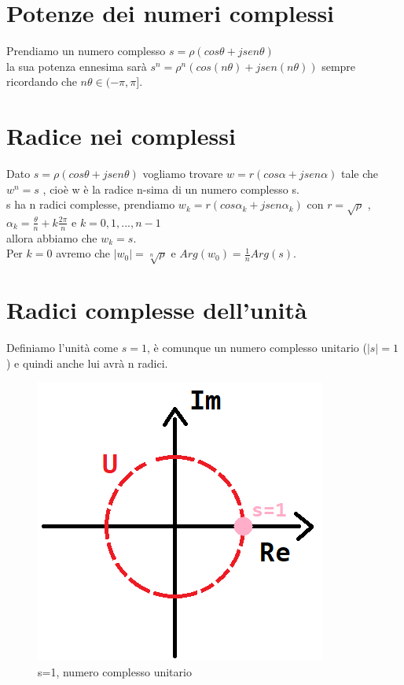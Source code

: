 \section{Potenze dei numeri complessi}
Prendiamo un numero complesso $ s = \rho (cos\theta + j sen\theta) $ \\
la sua potenza ennesima sarà $ s^{n} = \rho^{n} (cos(n\theta) + j sen(n\theta ) ) $ sempre ricordando che $n\theta \in (-\pi , \pi ]$.

\section{Radice nei complessi}

Dato $ s = \rho (cos\theta + j sen\theta) $ vogliamo trovare $ w = r (cos\alpha + j sen \alpha )$ tale che $ w^{n} = s$ , cioè w è la radice n-sima di un numero complesso s. \\
s ha n radici complesse, prendiamo $ w_{k} = r (cos\alpha_{k} + j sen \alpha_{k} ) $ con $r = \sqrt{\rho}$ , $ \alpha_{k} = \frac{\theta}{ n} + k \frac{2 \pi}{n} $ e $ k = 0,1,...,n-1$ \\
allora abbiamo che $ w_{k} = s$. \\

Per $ k = 0$ avremo che $ |w_{0}| = \sqrt[n]{ \rho}  $ e $ Arg(w_{0}) = \frac{1}{n} Arg(s)$.\\

\section{Radici complesse dell'unità}

Definiamo l'unità come $s=1$, è comunque un numero complesso unitario ($ |s| = 1$) e quindi anche lui avrà n radici.\\

\begin{figure}[h]
	\centering
	\includegraphics[scale=0.5]{immagini/pianoComplessoUnitari-s}
	\caption{ s=1, numero complesso unitario }
	\label{fig: numero complesso unitario}
\end{figure}


